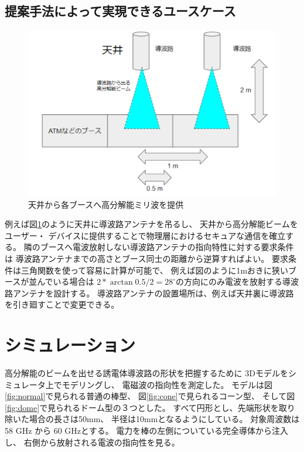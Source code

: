 \documentclass[technicalreport]{ieicej}
\begin{document}
\subsection{提案手法によって実現できるユースケース}

\begin{figure}[tb]
  \vspace{20mm}
  \begin{center}
    \includegraphics[bb=0 0 384 262, width=0.7\linewidth]{img/usecase.pdf}
    \caption{天井から各ブースへ高分解能ミリ波を提供}
    \label{fig:usecase}
  \end{center}
\end{figure}


例えば図\ref{fig:usecase}のように天井に導波路アンテナを吊るし、
天井から高分解能ビームをユーザー・
デバイスに提供することで物理層におけるセキュアな通信を確立する。
隣のブースへ電波放射しない導波路アンテナの指向特性に対する要求条件は
導波路アンテナまでの高さとブース同士の距離から逆算すればよい。
要求条件は三角関数を使って容易に計算が可能で、
例えば図のように1mおきに狭いブースが並んでいる場合は
$2 * \arctan 0.5 / 2 = 28^{\circ}$の方向にのみ電波を放射する導波路アンテナを設計する。
導波路アンテナの設置場所は、例えば天井裏に導波路を引き廻すことで変更できる。

\section{シミュレーション}

高分解能のビームを出せる誘電体導波路の形状を把握するために
3Dモデルをシミュレータ上でモデリングし、
電磁波の指向性を測定した。
モデルは図\ref{fig:normal}で見られる普通の棒型、
図\ref{fig:cone}で見られるコーン型、
そして図\ref{fig:dome}で見られるドーム型の３つとした。
すべて円形とし、先端形状を取り除いた場合の長さは50mm、
半径は10mmとなるようにしている。
対象周波数は58 GHz から 60 GHzとする。
電力を棒の左側についている完全導体から注入し、
右側から放射される電波の指向性を見る。
\end{document}
